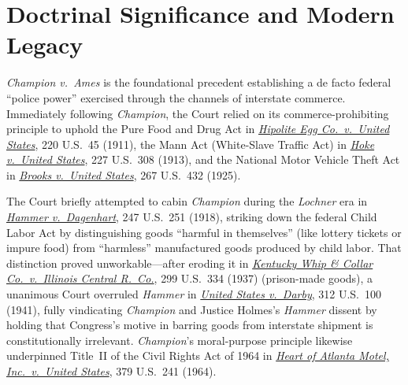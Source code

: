 \documentclass[12pt]{article}
\begin{document}
\section{Doctrinal Significance and Modern Legacy}
\textit{Champion v.\ Ames} is the foundational precedent establishing a de facto federal ``police power'' exercised through the channels of interstate commerce. Immediately following \textit{Champion}, the Court relied on its commerce-prohibiting principle to uphold the Pure Food and Drug Act in \href{https://supreme.justia.com/cases/federal/us/220/45/}{\textit{Hipolite Egg Co.\ v.\ United States}}, 220 U.S.\ 45 (1911), the Mann Act (White-Slave Traffic Act) in \href{https://supreme.justia.com/cases/federal/us/227/308/}{\textit{Hoke v.\ United States}}, 227 U.S.\ 308 (1913), and the National Motor Vehicle Theft Act in \href{https://supreme.justia.com/cases/federal/us/267/432/}{\textit{Brooks v.\ United States}}, 267 U.S.\ 432 (1925).

The Court briefly attempted to cabin \textit{Champion} during the \textit{Lochner} era in \href{https://supreme.justia.com/cases/federal/us/247/251/}{\textit{Hammer v.\ Dagenhart}}, 247 U.S.\ 251 (1918), striking down the federal Child Labor Act by distinguishing goods ``harmful in themselves'' (like lottery tickets or impure food) from ``harmless'' manufactured goods produced by child labor. That distinction proved unworkable---after eroding it in \href{https://supreme.justia.com/cases/federal/us/299/334/}{\textit{Kentucky Whip \& Collar Co.\ v.\ Illinois Central R.\ Co.}}, 299 U.S.\ 334 (1937) (prison-made goods), a unanimous Court overruled \textit{Hammer} in \href{https://supreme.justia.com/cases/federal/us/312/100/}{\textit{United States v.\ Darby}}, 312 U.S.\ 100 (1941), fully vindicating \textit{Champion} and Justice Holmes's \textit{Hammer} dissent by holding that Congress's motive in barring goods from interstate shipment is constitutionally irrelevant. \textit{Champion}'s moral-purpose principle likewise underpinned Title~II of the Civil Rights Act of 1964 in \href{https://supreme.justia.com/cases/federal/us/379/241/}{\textit{Heart of Atlanta Motel, Inc.\ v.\ United States}}, 379 U.S.\ 241 (1964).
\end{document}
